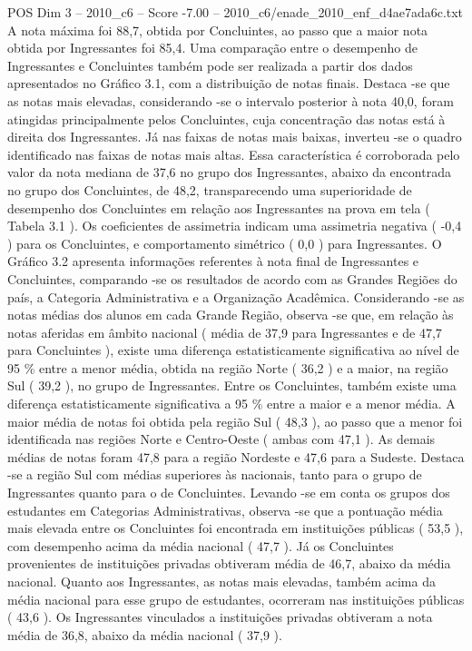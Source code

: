 \begin{textsample}{POS Dim 3 – 2010\_c6 – Score -7.00 – 2010\_c6/enade\_2010\_enf\_d4ae7ada6c.txt}
A nota máxima foi 88,7, obtida por Concluintes, ao passo que a maior nota obtida por Ingressantes foi 85,4.
Uma comparação entre o desempenho de Ingressantes e Concluintes também pode ser realizada a partir dos dados apresentados no Gráfico 3.1, com a distribuição de notas finais.
Destaca -se que as notas mais elevadas, considerando -se o intervalo posterior à nota 40,0, foram atingidas principalmente pelos Concluintes, cuja concentração das notas está à direita dos Ingressantes.
Já nas faixas de notas mais baixas, inverteu -se o quadro identificado nas faixas de notas mais altas.
Essa característica é corroborada pelo valor da nota mediana de 37,6 no grupo dos Ingressantes, abaixo da encontrada no grupo dos Concluintes, de 48,2, transparecendo uma superioridade de desempenho dos Concluintes em relação aos Ingressantes na prova em tela ( Tabela 3.1 ).
Os coeficientes de assimetria indicam uma assimetria negativa ( -0,4 ) para os Concluintes, e comportamento simétrico ( 0,0 ) para Ingressantes.
O Gráfico 3.2 apresenta informações referentes à nota final de Ingressantes e Concluintes, comparando -se os resultados de acordo com as Grandes Regiões do país, a Categoria Administrativa e a Organização Acadêmica.
Considerando -se as notas médias dos alunos em cada Grande Região, observa -se que, em relação às notas aferidas em âmbito nacional ( média de 37,9 para Ingressantes e de 47,7 para Concluintes ), existe uma diferença estatisticamente significativa ao nível de 95 \% entre a menor média, obtida na região Norte ( 36,2 ) e a maior, na região Sul ( 39,2 ), no grupo de Ingressantes.
Entre os Concluintes, também existe uma diferença estatisticamente significativa a 95 \% entre a maior e a menor média.
A maior média de notas foi obtida pela região Sul ( 48,3 ), ao passo que a menor foi identificada nas regiões Norte e Centro-Oeste ( ambas com 47,1 ).
As demais médias de notas foram 47,8 para a região Nordeste e 47,6 para a Sudeste.
Destaca -se a região Sul com médias superiores às nacionais, tanto para o grupo de Ingressantes quanto para o de Concluintes.
Levando -se em conta os grupos dos estudantes em Categorias Administrativas, observa -se que a pontuação média mais elevada entre os Concluintes foi encontrada em instituições públicas ( 53,5 ), com desempenho acima da média nacional ( 47,7 ).
Já os Concluintes provenientes de instituições privadas obtiveram média de 46,7, abaixo da média nacional.
Quanto aos Ingressantes, as notas mais elevadas, também acima da média nacional para esse grupo de estudantes, ocorreram nas instituições públicas ( 43,6 ).
Os Ingressantes vinculados a instituições privadas obtiveram a nota média de 36,8, abaixo da média nacional ( 37,9 ).

\end{textsample}
